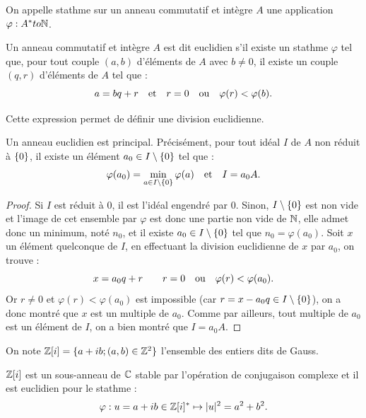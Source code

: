 \begin{defn}[Stathme]
On appelle stathme sur un anneau commutatif et intègre $A$ une application $\varphi : A^{\ast} to \mathbb{N}$.
\end{defn}

\begin{defn}
Un anneau commutatif et intègre $A$ est dit euclidien s'il existe un stathme $\varphi$ tel que, pour tout couple $(a,b)$ d'éléments de $A$
avec $b \neq 0$, il existe un couple $(q,r)$ d'éléments de $A$ tel que :
\[ a = bq + r \quad \text{et} \quad r = 0 \quad \text{ou} \quad \varphi(r) < \varphi(b) . \]
\end{defn}

\begin{rmq}
Cette expression permet de définir une division euclidienne.
\end{rmq}

\begin{thm}
Un anneau euclidien est principal. Précisément, pour tout idéal $I$ de $A$ non réduit à $\{ 0 \}$, 
il existe un élément $a_0 \in I \setminus \{ 0 \}$ tel que :
\[ \varphi(a_0) = \min_{a \in I \setminus \{ 0 \}} \varphi(a) \quad \text{et} \quad I = a_0 A . \]
\end{thm}

\begin{proof}
Si $I$ est réduit à 0, il est l'idéal engendré par 0. Sinon, $I \setminus \{ 0 \}$ est non vide et l'image de cet ensemble par $\varphi$
est donc une partie non vide de $\mathbb{N}$, elle admet donc un minimum, noté $n_0$, et il existe $a_0 \in I \setminus \{ 0 \}$ tel que 
$n_0 = \varphi(a_0)$. Soit $x$ un élément quelconque de $I$, en effectuant la division euclidienne de $x$ par $a_0$, on trouve :
\[ x = a_0 q + r \qquad r=0 \quad \text{ou} \quad \varphi(r) < \varphi(a_0) . \]
Or $r \neq 0$ et $\varphi(r) < \varphi(a_0)$ est impossible (car $r = x - a_0 q \in I \setminus \{ 0 \}$), on a donc montré que $x$ est un 
multiple de $a_0$. Comme par ailleurs, tout multiple de $a_0$ est un élément de $I$, on a bien montré que $I = a_0 A$. 
\end{proof}

\begin{nota}
On note $\mathbb{Z}[i] = \{ a+ib ; (a,b) \in \mathbb{Z}^2 \}$ l'ensemble des entiers dits de Gauss.
\end{nota}

\begin{thm}
$\mathbb{Z}[i]$ est un sous-anneau de $\mathbb{C}$ stable par l'opération de conjugaison complexe et il est euclidien pour le stathme :
\[ \varphi : u = a+ib \in \mathbb{Z}[i]^{\ast} \mapsto \lvert u\rvert^2 = a^2 + b^2. \]
\end{thm}

